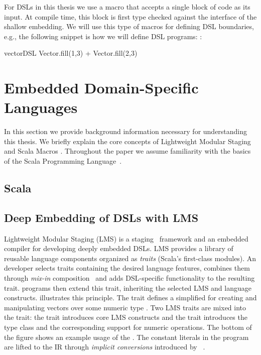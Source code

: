 For DSLs in this thesis we use a macro that accepts a single block of
 code as its input. At compile time, this block is first type checked
 against the interface of the shallow embedding.  We will use this type of macros
 for defining DSL boundaries, e.g., the following snippet is how we will define DSL
 programs:
:\begin{lstparagraph}
vectorDSL {
  Vector.fill(1,3) + Vector.fill(2,3)
}
\end{lstparagraph}


\section{Embedded Domain-Specific Languages}
\label{sec:embedded-domain-specific-languages}

In this section we provide background information necessary for understanding this
thesis. We briefly explain the core concepts of Lightweight Modular Staging
\cite{rompf2012lightweight,rompf_optimizing_2013} and Scala Macros
\cite{burmako_scala_2013}. Throughout the paper we assume familiarity with
the basics of the Scala Programming Language~\cite{odersky_scala_2004}.
\subsection{Scala}
\subsection{Deep Embedding of DSLs with LMS}
\label{subsec:deep-embedding}

Lightweight Modular Staging (LMS) is a
staging~\cite{taha_multi-stage_1997} framework and an embedded
compiler for developing deeply embedded DSLs.  LMS provides a library
of reusable language components organized as \emph{traits} (Scala's
first-class modules).  An \edsl developer selects traits containing
the desired language features, combines them through \emph{mix-in}
composition~\cite{odersky_scalable_2005} and adds DSL-specific
functionality to the resulting \edsl trait.  \edsl programs then
extend this trait, inheriting the selected LMS and \edsl language
constructs.  illustrates this principle.  The trait
 defines a simplified \edsl for creating and
manipulating vectors over some numeric type .  Two LMS traits
are mixed into the  trait: the  trait
introduces core LMS constructs %
and the  trait introduces the  type
class and the corresponding support for numeric operations.  The
bottom of the figure shows an example usage of the \edsl. The constant
literals in the program are lifted to the IR through \emph{implicit
  conversions} introduced by
~\cite{oliveira_type_2010}.

